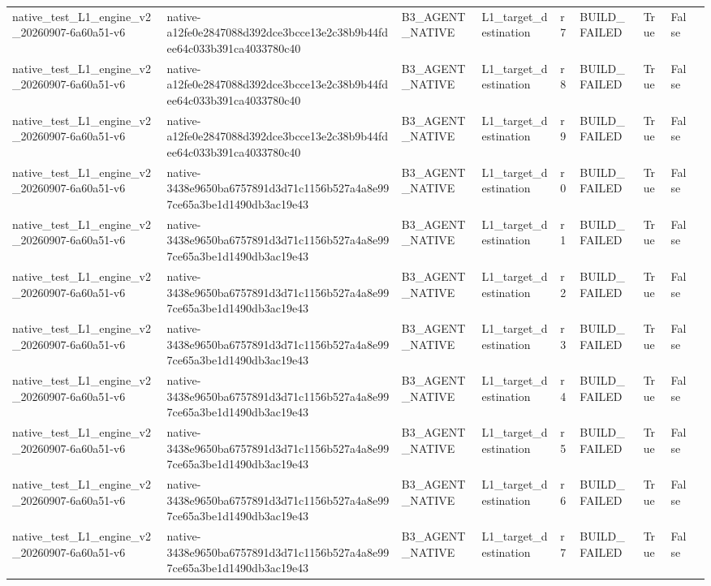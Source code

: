 \begin{tabular}{lllllllll}
native\_test\_L1\_engine\_v2\_20260907-6a60a51-v6 & native-a12fe0e2847088d392dce3bcce13e2c38b9b44fdee64c033b391ca4033780c40 & B3\_AGENT\_NATIVE & L1\_target\_destination & r7 & BUILD\_FAILED & True & False &  \\
native\_test\_L1\_engine\_v2\_20260907-6a60a51-v6 & native-a12fe0e2847088d392dce3bcce13e2c38b9b44fdee64c033b391ca4033780c40 & B3\_AGENT\_NATIVE & L1\_target\_destination & r8 & BUILD\_FAILED & True & False &  \\
native\_test\_L1\_engine\_v2\_20260907-6a60a51-v6 & native-a12fe0e2847088d392dce3bcce13e2c38b9b44fdee64c033b391ca4033780c40 & B3\_AGENT\_NATIVE & L1\_target\_destination & r9 & BUILD\_FAILED & True & False &  \\
native\_test\_L1\_engine\_v2\_20260907-6a60a51-v6 & native-3438e9650ba6757891d3d71c1156b527a4a8e997ce65a3be1d1490db3ac19e43 & B3\_AGENT\_NATIVE & L1\_target\_destination & r0 & BUILD\_FAILED & True & False &  \\
native\_test\_L1\_engine\_v2\_20260907-6a60a51-v6 & native-3438e9650ba6757891d3d71c1156b527a4a8e997ce65a3be1d1490db3ac19e43 & B3\_AGENT\_NATIVE & L1\_target\_destination & r1 & BUILD\_FAILED & True & False &  \\
native\_test\_L1\_engine\_v2\_20260907-6a60a51-v6 & native-3438e9650ba6757891d3d71c1156b527a4a8e997ce65a3be1d1490db3ac19e43 & B3\_AGENT\_NATIVE & L1\_target\_destination & r2 & BUILD\_FAILED & True & False &  \\
native\_test\_L1\_engine\_v2\_20260907-6a60a51-v6 & native-3438e9650ba6757891d3d71c1156b527a4a8e997ce65a3be1d1490db3ac19e43 & B3\_AGENT\_NATIVE & L1\_target\_destination & r3 & BUILD\_FAILED & True & False &  \\
native\_test\_L1\_engine\_v2\_20260907-6a60a51-v6 & native-3438e9650ba6757891d3d71c1156b527a4a8e997ce65a3be1d1490db3ac19e43 & B3\_AGENT\_NATIVE & L1\_target\_destination & r4 & BUILD\_FAILED & True & False &  \\
native\_test\_L1\_engine\_v2\_20260907-6a60a51-v6 & native-3438e9650ba6757891d3d71c1156b527a4a8e997ce65a3be1d1490db3ac19e43 & B3\_AGENT\_NATIVE & L1\_target\_destination & r5 & BUILD\_FAILED & True & False &  \\
native\_test\_L1\_engine\_v2\_20260907-6a60a51-v6 & native-3438e9650ba6757891d3d71c1156b527a4a8e997ce65a3be1d1490db3ac19e43 & B3\_AGENT\_NATIVE & L1\_target\_destination & r6 & BUILD\_FAILED & True & False &  \\
native\_test\_L1\_engine\_v2\_20260907-6a60a51-v6 & native-3438e9650ba6757891d3d71c1156b527a4a8e997ce65a3be1d1490db3ac19e43 & B3\_AGENT\_NATIVE & L1\_target\_destination & r7 & BUILD\_FAILED & True & False &  \\

\end{tabular}
